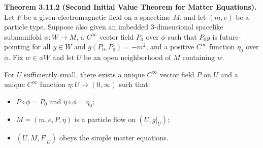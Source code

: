 \textbf{Theorem 3.11.2 (Second Initial Value Theorem for Matter Equations).}
Let $F$ be a given electromagnetic field on a spacetime $M$, and let $(m, e)$ be a particle type. Suppose also given an imbedded $3$-dimensional spacelike submanifold $\phi: W \to M$, a $C^\infty$ vector field $P_0$ over $\phi$ such that $P_0 y$ is future-pointing for all $y \in W$ and $g(P_0, P_0) = -m^2$, and a positive $C^\infty$ function $\eta_0$ over $\phi$. Fix $w \in \phi W$ and let $U$ be an open neighborhood of $M$ containing $w$.

For $U$ sufficiently small, there exists a unique $C^\infty$ vector field $P$ on $U$ and a unique $C^\infty$ function $\eta: U \to (0, \infty)$ such that:
\begin{itemize}
  \item[(a)] $P \circ \phi = P_0$ and $\eta \circ \phi = \eta_0$;
  \item[(b)] $M = (m, e, P, \eta)$ is a particle flow on $(U, g|_U)$;
  \item[(c)] $(U, M, F|_U)$ obeys the simple matter equations.
\end{itemize}
